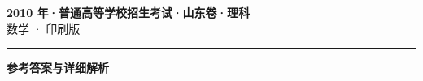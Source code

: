 \documentclass[zihao=5, a4paper]{ctexart}
\begin{document}
\begin{center}
  {\Large\bfseries 2010 年·普通高等学校招生考试·山东卷·理科}\\[4pt]
  {\large 数学 · 印刷版}
\end{center}
\medskip
{}

\par\bigskip\hrule\bigskip
{}
\begin{center}{\large\bfseries 参考答案与详细解析}\end{center}
\smallskip

\end{document}

